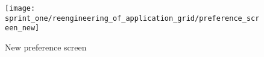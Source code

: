 
\begin{figure}[!htbp]
    \centering
    \texttt{[image: sprint\_one/reengineering\_of\_application\_grid/preference\_screen\_new]}
    \caption{New preference screen}
    \label{fig:preference_screen_new}
\end{figure}